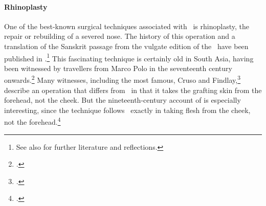 

\paragraph{Rhinoplasty}
\label{sec:rhinoplasty}

One of the best-known surgical techniques associated with \SS\ is rhinoplasty, the repair or rebuilding of a severed nose. The history of this operation and a translation of the Sanskrit passage from
the vulgate edition of the \SS\ have been published in \citet[67--70, 99--100]{wuja-2003}.\footnote{See
also \cite[IB, 327--328, note 186]{meul-hist} for further literature and
reflections.}  This fascinating technique is certainly old in South Asia, having
been witnessed by travellers from Marco Polo in the seventeenth century
onwards.\footcite[ii.301]{manu-stor} Many witnesses, including the most famous,
Cruso and Findlay,\footcite[883, 891\,f.]{cowasjee} describe an operation that
differs from \SS\ in that it takes the grafting skin from the
forehead, not the cheek.  But the nineteenth-century account of
\citeauthor{thor-bann} is especially interesting, since the technique follows
\SS\ exactly in taking flesh from the cheek, not the
forehead.\footcite[352--3]{thor-bann}


